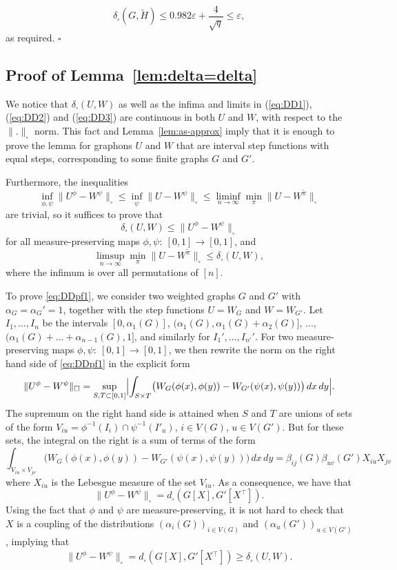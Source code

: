 \documentclass[12pt]{article}
\numberwithin{equation}{section}
\def\eps{\varepsilon}
\def\T{{^\top}}
\begin{document}
\[
\delta_\square(G,\widetilde H)\leq 0.982\eps+
\frac{4}{\sqrt q}\leq \eps,
\]
as required.  \hfill$\square$

\subsection{Proof of Lemma~\ref{lem:delta=delta}}

We notice that $\delta_\square(U,W)$ as well as the infima and limits
in (\ref{eq:DD1}), (\ref{eq:DD2}) and (\ref{eq:DD3}) are continuous
in both $U$ and $W$, with respect to the $\|.\|_\square$ norm. This
fact and Lemma~\ref{lem:as-approx} imply that it is enough to prove
the lemma for graphons $U$ and $W$ that are interval step functions
with equal steps, corresponding to some finite graphs $G$ and $G'$.

Furthermore, the inequalities
\[
\inf_{\phi,\psi}\|U^\phi-W^\psi\|_\square \le
\inf_{\psi}\|U-W^\psi\|_\square\le
\liminf_{n\to\infty}\min_{\pi}\|U-W^{\tilde{\pi}}\|_\square
\]
are trivial, so it suffices to prove that
\begin{equation}\label{eq:DDpf1}
\delta_\square(U,W)\le\|U^\phi-W^\psi\|_\square
\end{equation}
for all measure-preserving maps $\phi,\psi:~[0,1]\to[0,1]$, and
\begin{equation}\label{eq:DDpf2}
\limsup_{n\to\infty}\min_{\pi}\|U-W^{\tilde{\pi}}\|_\square
\le\delta_\square(U,W),
\end{equation}
where the infimum is over all permutations of $[n]$.

To prove \eqref{eq:DDpf1}, we consider two weighted graphs $G$ and
$G'$ with $\alpha_G=\alpha_G'=1$, together with the step functions
$U=W_G$ and $W=W_{G'}$. Let $I_1,\dots, I_n$ be the intervals
$[0,\alpha_1(G)]$, $(\alpha_1(G),\alpha_1(G)+\alpha_2(G)]$, $\dots$,
$(\alpha_1(G)+\dots+\alpha_{n-1}(G),1]$, and similarly for
$I_1',\dots,I_{n'}'$. For two measure-preserving maps
$\phi,\psi:~[0,1]\to[0,1]$, we then rewrite the norm on the right
hand side of \eqref{eq:DDpf1} in the explicit form
\[
\|U^\phi-W^\psi\|_\square = \sup_{S,T\subset
[0,1]}\Bigl|\int_{S\times T}
\bigl(W_G(\phi(x),\phi(y))-W_{G'}(\psi(x),\psi(y))\bigr)\,dx\,dy\Bigr|.
\]
The supremum on the right hand side is attained when $S$ and $T$ are
unions of sets of the form $V_{iu}=
\phi^{-1}(I_i)\cap\psi^{-1}(I'_u)$, $i\in V(G)$, $u\in V(G')$. But
for these sets, the integral on the right is a sum of terms of the
form
\[
\int_{V_{iu}\times V_{jv}}
\bigl(W_G(\phi(x),\phi(y))-W_{G'}(\psi(x),\psi(y))\bigr)\,dx\,dy =
\beta_{ij}(G)\beta_{uv}(G')X_{iu}X_{jv}
\]
where $X_{iu}$ is the Lebesgue measure of the set $V_{iu}$.  As a
consequence, we have that
\[
\|U^\phi-W^\psi\|_\square = d_\square(G[X],G'[X\T]).
\]
Using the fact that $\phi$ and $\psi$ are measure-preserving, it is
not hard to check that $X$ is a coupling of the distributions
$(\alpha_i(G))_{i\in V(G)}$ and $(\alpha_u(G'))_{u\in V(G')}$,
implying that
\begin{align}
\|U^\phi-W^\psi\|_\square = d_\square(G[X],G'[X\T]) \ge
\delta_\square(U,W).
\end{align}
\end{document}
